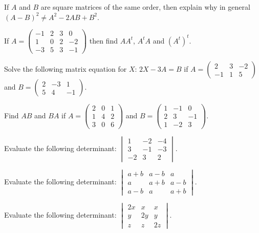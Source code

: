 \documentclass[11pt,a4paper]{article}
\begin{document}
\begin{shortlist}
\item If $A$ and $B$ are square matrices of the same order, then explain why in general $(A-B)^2\neq A^2-2AB+B^2$.

\item If $A=\begin{pmatrix}-1 & 2 & 3 & 0\\ 1 & 0 & 2 & -2\\ -3 & 5 & 3 & -1\end{pmatrix}$ then find $AA^t$, $A^tA$ and $(A^t)^t$.

\item Solve the following matrix equation for $X$: $2X-3A=B$ if $A=\begin{pmatrix}2 & 3 & -2\\ -1 & 1 & 5\end{pmatrix}$ and $B=\begin{pmatrix}2 & -3 & 1\\ 5 & 4 & -1\end{pmatrix}$.

\item Find $AB$ and $BA$ if $A=\begin{pmatrix}2 & 0 & 1\\ 1 & 4 & 2\\ 3 & 0 & 6\end{pmatrix}$ and $B=\begin{pmatrix}1 & -1 & 0\\ 2 & 3 & -1\\ 1 & -2 & 3\end{pmatrix}$.

\item Evaluate the following determinant: $\begin{vmatrix}1 & -2 & -4\\ 3 & -1 & -3\\ -2 & 3 & 2\end{vmatrix}$.

\item Evaluate the following determinant: $\begin{vmatrix}a+b & a-b & a\\ a & a+b & a-b\\ a-b & a & a+b\end{vmatrix}$.

\item Evaluate the following determinant: $\begin{vmatrix}2x & x & x\\ y & 2y & y\\ z & z & 2z\end{vmatrix}$.


\end{shortlist}
\end{document}
